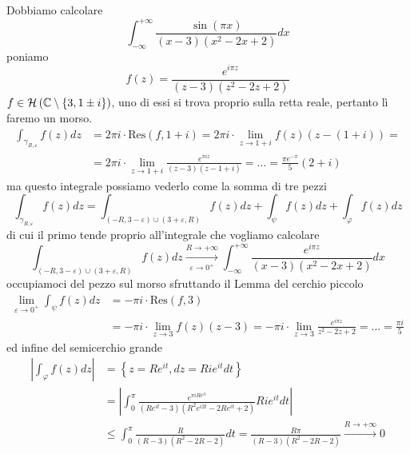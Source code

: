 Dobbiamo calcolare
\begin{equation*}
\int ^{+\infty }_{-\infty }\frac{\sin\left( \pi x\right)}{\left( x-3\right)\left( x^{2} -2x+2\right)} dx
\end{equation*}
poniamo
\begin{equation*}
f\left( z\right) =\frac{e^{i\pi z}}{\left( z-3\right)\left( z^{2} -2z+2\right)}
\end{equation*}
$f\in \mathcal{H} \left(\mathbb{C}  \setminus \left\{3,1\pm i\right\}\right)$, uno di essi si trova proprio sulla retta reale, pertanto lì faremo un morso.
\begin{align*}
\int _{\gamma _{R,\varepsilon }} f\left( z\right) dz & =2\pi i\cdotp \mathrm{Res}\left( f,1+i\right) =2\pi i\cdotp \lim _{z\rightarrow 1+i} f\left( z\right)\left( z-\left( 1+i\right)\right) =\\
 & =2\pi i\cdotp \lim _{z\rightarrow 1+i}\frac{e^{\pi iz}}{\left( z-3\right)\left( z-1+i\right)} =\dotsc =\frac{\pi e^{-\pi }}{5}\left( 2+i\right)
\end{align*}
ma questo integrale possiamo vederlo come la somma di tre pezzi
\begin{equation*}
\int _{\gamma _{R,\varepsilon }} f\left( z\right) dz=\int _{\left( -R,3-\varepsilon \right) \cup \left( 3+\varepsilon ,R\right)} f\left( z\right) dz+\int _{\psi } f\left( z\right) dz+\int _{\varphi } f\left( z\right) dz
\end{equation*}
di cui il primo tende proprio all'integrale che vogliamo calcolare
\begin{equation*}
\int _{\left( -R,3-\varepsilon \right) \cup \left( 3+\varepsilon ,R\right)} f\left( z\right) dz\xrightarrow[\varepsilon \rightarrow 0^{+}]{R\rightarrow +\infty }\int ^{+\infty }_{-\infty }\frac{e^{i\pi z}}{\left( x-3\right)\left( x^{2} -2x+2\right)} dx
\end{equation*}
occupiamoci del pezzo sul morso sfruttando il Lemma del cerchio piccolo
\begin{align*}
\lim _{\varepsilon \rightarrow 0^{+}}\int _{\psi } f\left( z\right) dz & =-\pi i\cdotp \mathrm{Res}\left( f,3\right)\\
 & =-\pi i\cdotp \lim _{z\rightarrow 3} f\left( z\right)\left( z-3\right) =-\pi i\cdotp \lim _{z\rightarrow 3}\frac{e^{i\pi z}}{z^{2} -2z+2} =\dotsc =\frac{\pi i}{5}
\end{align*}
ed infine del semicerchio grande
\begin{align*}
\left| \int _{\varphi } f\left( z\right) dz\right|  & =\left\{z=Re^{it} ,dz=Rie^{it} dt\right\}\\
 & =\left| \int ^{\pi }_{0}\frac{e^{\pi iRe^{it}}}{\left( Re^{it} -3\right)\left( R^{2} e^{i2t} -2Re^{it} +2\right)} Rie^{it} dt\right| \\
 & \leqslant \int ^{\pi }_{0}\frac{R}{\left( R-3\right)\left( R^{2} -2R-2\right)} dt=\frac{R\pi }{\left( R-3\right)\left( R^{2} -2R-2\right)}\xrightarrow{R\rightarrow +\infty } 0
\end{align*}
